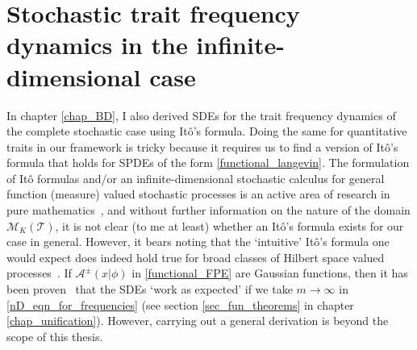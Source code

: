 \section{Stochastic trait frequency dynamics in the infinite-dimensional case}
In chapter \ref{chap_BD}, I also derived SDEs for the trait frequency dynamics of the complete stochastic case using It\^o's formula. Doing the same for quantitative traits in our framework is tricky because it requires us to find a version of It\^o's formula that holds for SPDEs of the form \eqref{functional_langevin}. The formulation of It\^o formulas and/or an infinite-dimensional stochastic calculus for general function (measure) valued stochastic processes is an active area of research in pure mathematics~\citep{da_prato_stochastic_2014}, and without further information on the nature of the domain $\mathcal{M}_{K}(\mathcal{T})$, it is not clear (to me at least) whether an It\^o's formula exists for our case in general. However, it bears noting that the `intuitive' It\^o's formula one would expect does indeed hold true for broad classes of Hilbert space valued processes~\citep{prevot_concise_2007,da_prato_stochastic_2014,liu_stochastic_2015}. If $\mathcal{A}^{\pm}(x | \phi)$ in \eqref{functional_FPE} are Gaussian functions, then it has been proven~\citep{week_white_2021} that the SDEs `work as expected' if we take $m \to \infty$ in \eqref{nD_eqn_for_frequencies} (see section \ref{sec_fun_theorems} in chapter \ref{chap_unification}). However, carrying out a general derivation is beyond the scope of this thesis.

